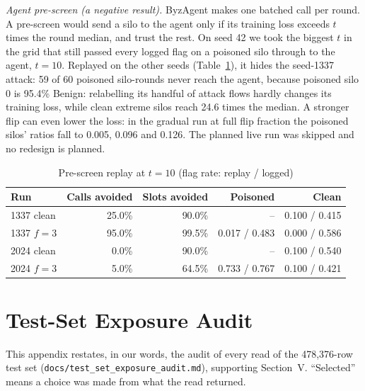 \emph{Agent pre-screen (a negative result).} ByzAgent makes one batched call per round.
A pre-screen would send a silo to the agent only if its training loss exceeds $t$ times
the round median, and trust the rest. On seed 42 we took the biggest $t$ in the grid %
that still passed every logged flag on a poisoned silo through to the agent, $t=10$. %
Replayed on the other seeds %
(Table~\ref{tab:prescreen}), it hides the seed-1337 attack: 59 of 60 poisoned silo-rounds %
never reach the agent, because poisoned silo 0 is 95.4\% Benign: relabelling its %
handful of attack flows hardly changes its training loss, while clean extreme silos reach 24.6 times the median. %
A stronger flip can even lower the loss: in the gradual run at full flip fraction the
poisoned silos' ratios fall to 0.005, 0.096 and 0.126. The planned live run was skipped %
and no redesign is planned.

\begin{table}[h]
\centering
\caption{Pre-screen replay at $t=10$ (flag rate: replay / logged)} %
\label{tab:prescreen}
\footnotesize
\setlength{\tabcolsep}{2.5pt}
\begin{tabular}{@{}lrrrr@{}}
\toprule
Run & Calls avoided & Slots avoided & Poisoned & Clean\\
\midrule
1337 clean & 25.0\% & 90.0\% & -- & 0.100 / 0.415\\ %
1337 $f=3$ & 95.0\% & 99.5\% & 0.017 / 0.483 & 0.000 / 0.586\\ %
2024 clean & 0.0\% & 90.0\% & -- & 0.100 / 0.540\\ %
2024 $f=3$ & 5.0\% & 64.5\% & 0.733 / 0.767 & 0.100 / 0.421\\ %
\bottomrule
\end{tabular}
\end{table}

\section{Test-Set Exposure Audit}
\label{app:testaudit}
This appendix restates, in our words, the audit of every read of the 478,376-row test %
set (\texttt{docs/test\_set\_exposure\_audit.md}), supporting Section~V. ``Selected''
means a choice was made from what the read returned.


